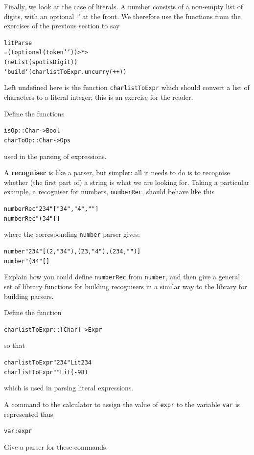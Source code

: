Finally, we look at the case of literals. A number consists of a non-empty
list of digits, with an optional `\texttt{\twid}' at the front. We therefore use
the functions from the exercises of the previous section to say
\begin{alltt}
litParse 
  = ((optional (token '\twid')) >*>
     (neList (spot isDigit)) 
    `build` (charlistToExpr . uncurry (++)) 
\end{alltt}
Left undefined here is the function \texttt{charlistToExpr} which should convert
a list of characters to a literal integer; this is an exercise for the reader.

\begin{exercises}

\item
Define the functions 
\begin{alltt}
isOp     :: Char -> Bool
charToOp :: Char -> Ops
\end{alltt}
used in the parsing of expressions.


\item
A \textbf{recogniser} is like a parser, but simpler: all it needs to do is to recognise whether (the first part of) a string is what we are looking for. Taking a particular example, a recogniser for numbers, \texttt{numberRec}, should behave like this
\begin{alltt}
numberRec "234"  \step{}["34" , "4" , ""]
numberRec "(34"  \step{}[]
\end{alltt}
where the corresponding \texttt{number} parser gives:
\begin{alltt}
number "234"  \step{}[(2,"34") , (23,"4") , (234,"")]
number "(34"  \step{}[]
\end{alltt}
Explain how you could define \texttt{numberRec} from \texttt{number}, and then give a general set of library functions for building recognisers in a similar way to the library for building parsers.



\item
Define the function
\begin{alltt}
charlistToExpr :: [Char] -> Expr
\end{alltt}
so that
\begin{alltt}
charlistToExpr "234" \step{}Lit 234
charlistToExpr "" \step{}Lit (-98)
\end{alltt}
which is used in parsing literal expressions.

\item
A command to the calculator to assign the value of \texttt{expr} to the variable
\texttt{var} is represented thus
\begin{alltt}
var:expr
\end{alltt}
Give a parser for these commands.


\end{exercises}
